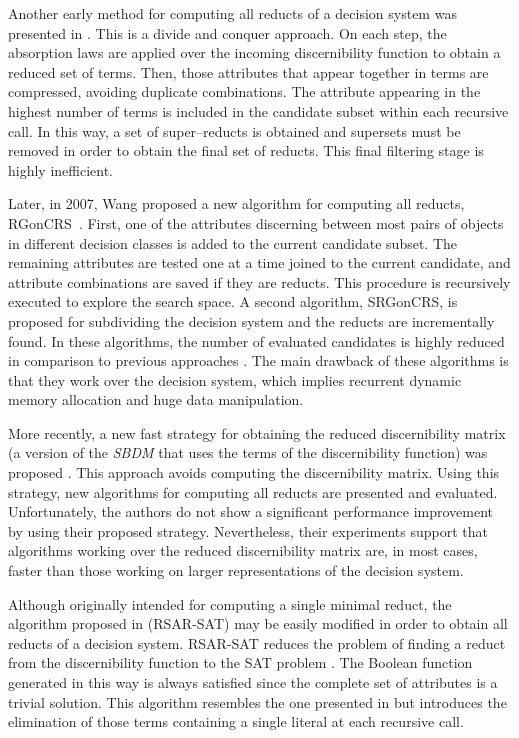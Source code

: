 \documentclass[number,preprint,review,12pt]{elsarticle}
\begin{document}
  Another early method for computing all reducts of a decision system was presented in \cite{Starzyk99,Starzyk00}.  This is a divide and conquer approach. On each step, the absorption laws are applied over the incoming discernibility function to obtain a reduced set of terms. Then, those attributes that appear together in terms are compressed, avoiding duplicate combinations. The attribute appearing in the highest number of terms is included in the candidate subset within each recursive call. In this way, a set of super--reducts is obtained and supersets must be removed in order to obtain the final set of reducts. This final filtering stage is highly inefficient.
   
  Later, in 2007, Wang proposed a new algorithm for computing all reducts, RGonCRS~\cite{WangP07}. First, one of the attributes discerning between most pairs of objects in different decision classes is added to the current candidate subset. The remaining attributes are tested one at a time joined to the current candidate, and attribute combinations are saved if they are reducts. This procedure is recursively executed to explore the search space. A second algorithm, SRGonCRS, is proposed for subdividing the decision system and the reducts are incrementally found. In these algorithms, the number of evaluated candidates is highly reduced in comparison to previous approaches \citep{Bazan2001,Ohrn00}. The main drawback of these algorithms is that they work over the decision system, which implies recurrent dynamic memory allocation and huge data manipulation.
  
  More recently, a new fast strategy for obtaining the reduced discernibility matrix (a version of the \textit{SBDM} that uses the terms of the discernibility function) was  proposed \cite{Chen2012}. This approach avoids computing the discernibility matrix. Using this strategy, new algorithms for computing all reducts are presented and evaluated. Unfortunately, the authors do not show a significant performance improvement by using their proposed strategy. Nevertheless, their experiments support that algorithms working over the reduced discernibility matrix are, in most cases, faster than those working on larger representations of the decision system.
  
  Although originally intended for computing a single minimal reduct, the algorithm proposed in \citep{Jensen14} (RSAR-SAT) may be easily modified in order to obtain all reducts of a decision system. RSAR-SAT reduces the problem of finding a reduct from the discernibility function to the SAT problem \citep{Davis62}. The Boolean function generated in this way is always satisfied since the complete set of attributes is a trivial solution. This algorithm resembles the one presented in \citep{Starzyk99} but introduces the elimination of those terms containing a single literal at each recursive call. 
\end{document}
